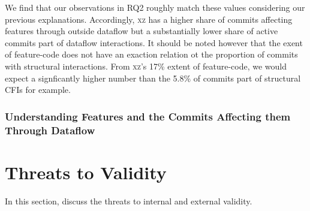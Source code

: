 We find that our observations in RQ2 roughly match these values considering our previous explanations.
Accordingly, \textsc{xz} has a higher share of commits affecting features through outside dataflow but a substantially lower share of active commits part of dataflow interactions.
It should be noted however that the exent of feature-code does not have an exaction relation ot the proportion of commits with structural interactions.
From \textsc{xz}'s 17\% extent of feature-code, we would expect a signficantly higher number than the 5.8\% of commits part of structural CFIs for example.










































\subsubsection*{Understanding Features and the Commits Affecting them Through Dataflow}

\section{Threats to Validity}\label{sec:threats}

In this section, discuss the threats to internal and external validity.

